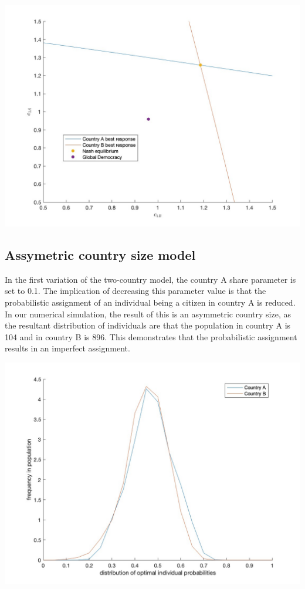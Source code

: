\documentclass[11pt,preprint, authoryear]{elsarticle}
\let\origfigure\figure
\let\endorigfigure\endfigure
\renewenvironment{figure}[1][2] {
    \expandafter\origfigure\expandafter[H]
} {
    \endorigfigure
}
\numberwithin{equation}{section}
\numberwithin{figure}{section}
\numberwithin{table}{section}
\begin{document}
\begin{figure}[H]

{\centering \includegraphics[width=0.45\linewidth]{images/Fig2_0.5Size0.9Bias} 

}

\caption{Nash equilibrium for assymetric bias model}\label{fig:unnamed-chunk-4}
\end{figure}

\hypertarget{assymetric-country-size-model}{%
\subsection*{Assymetric country size
model}\label{assymetric-country-size-model}}

In the first variation of the two-country model, the country A share
parameter is set to 0.1. The implication of decreasing this parameter
value is that the probabilistic assignment of an individual being a
citizen in country A is reduced. In our numerical simulation, the result
of this is an asymmetric country size, as the resultant distribution of
individuals are that the population in country A is 104 and in country B
is 896. This demonstrates that the probabilistic assignment results in
an imperfect assignment.

\begin{figure}[H]

{\centering \includegraphics[width=0.8\linewidth]{images/Fig4_0.1Size0Bias} 

}

\caption{Assymetric country size model: Kernel density function of the distribution of the optimal probabilty of crisis and frequency thereof across individuals in country A and country B}\label{fig:unnamed-chunk-5}
\end{figure}
\end{document}
